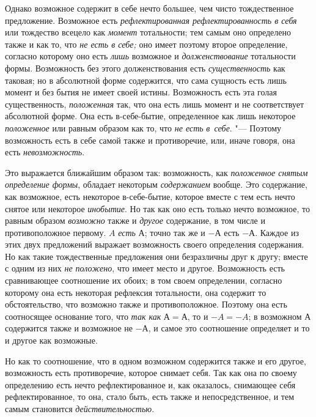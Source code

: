 Однако возможное содержит в себе нечто большее, чем чисто тождественное
предложение. Возможное есть {\em рефлектированная
рефлектированность в себя} или тождество всецело как
{\em момент} тотальности; тем самым оно определено
также и как то, что {\em не есть в себе;} оно имеет
поэтому второе определение, согласно которому оно есть
{\em лишь} возможное и
{\em долженствование} тотальности формы. Возможность
без этого долженствования есть {\em существенность} как
таковая; но в абсолютной форме содержится, что сама сущность есть лишь
момент и без бытия не имеет своей истины. Возможность есть эта голая
существенность, {\em положенная} так, что она есть лишь
момент и не соответствует абсолютной форме. Она есть в-себе-бытие,
определенное как лишь некоторое {\em положенное} или
равным образом как то, что {\em не есть}
{\em в~себе}. "--- Поэтому возможность есть в себе самой
также и противоречие, или, иначе говоря, она есть {\em невозможность}.

Это выражается ближайшим образом так: возможность, как
{\em положенное снятым определение формы}, обладает
некоторым {\em содержанием} вообще. Это содержание, как
возможное, есть некоторое в-себе-бытие, которое вместе с тем есть нечто
снятое или некоторое {\em инобытие}. Но так как оно
есть только нечто возможное, то равным образом
{\em возможно} также и {\em другое}
содержание, в том числе и противоположное первому. $A$ {\em есть}
$А$; точно так же и $-А$ есть $-А$. Каждое из этих двух
предложений выражает возможность своего определения содержания. Но как
такие тождественные предложения они безразличны друг к другу; вместе с
одним из них {\em не положено}, что имеет место и
другое. Возможность есть сравнивающее соотношение их обоих; в том своем
определении, согласно которому она есть некоторая рефлексия тотальности,
она содержит то обстоятельство, что возможно также и противоположное.
Поэтому она есть соотносящее основание того, что
{\em так как} $А=А$, то и $-A=-A$; в возможном $А$ содержится также и
возможное не $-А$, и самое это соотношение определяет и то и другое
как возможные.

Но как то соотношение, что в одном возможном содержится также и его другое,
возможность есть противоречие, которое снимает себя. Так как она по своему
определению есть нечто рефлектированное и, как оказалось, снимающее себя
рефлектированное, то она, стало быть, есть также и непосредственное, и тем
самым становится {\em действительностью}.

